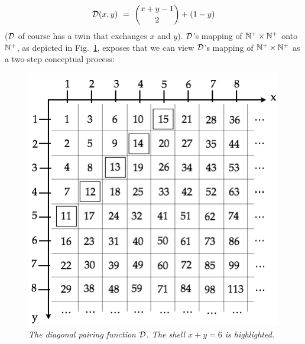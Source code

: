 \begin{equation}
\label{eq:diag}
\mbox{$\cal D$}(x, y) \ = \
{{x+y-1} \choose 2} + (1-y)
\end{equation}
($\mbox{$\cal D$}$ of course has a twin that exchanges $x$ and $y$).  $\mbox{$\cal D$}$'s
mapping of $\mathbb{N}^+ \times \mathbb{N}^+$ onto $\mathbb{N}^+$, as depicted in
Fig.~\ref{fig:diag}, exposes that we can view $\mbox{$\cal D$}$'s mapping of $\mathbb{N}^+
\times \mathbb{N}^+$ as a two-step conceptual process:
\begin{figure}[htb]
\begin{center}
      \includegraphics[scale=0.4]{FiguresArithmetic/PairingDiagonal}
\end{center}
\caption{{\it The diagonal pairing function $\mbox{$\cal D$}$.  The shell $x+y = 6$
    is highlighted.}
\label{fig:diag}}
\end{figure}
